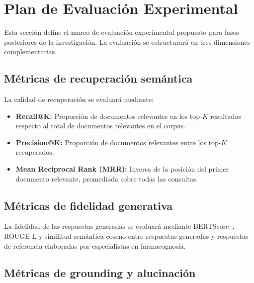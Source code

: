 
\section{Plan de Evaluación Experimental}
\label{sec:experiments}

Esta sección define el marco de evaluación experimental propuesto para fases posteriores de la investigación. La evaluación se estructurará en tres dimensiones complementarias.

\subsection{Métricas de recuperación semántica}
\label{subsec:exp_retrieval_metrics}

La calidad de recuperación se evaluará mediante:

\begin{itemize}[leftmargin=*]
  \item \textbf{Recall@K:} Proporción de documentos relevantes en los top-$K$ resultados respecto al total de documentos relevantes en el corpus.
  \item \textbf{Precision@K:} Proporción de documentos relevantes entre los top-$K$ recuperados.
  \item \textbf{Mean Reciprocal Rank (MRR):} Inversa de la posición del primer documento relevante, promediada sobre todas las consultas.
\end{itemize}

\subsection{Métricas de fidelidad generativa}
\label{subsec:exp_generation_metrics}

La fidelidad de las respuestas generadas se evaluará mediante BERTScore~\cite{zhang2020bertscore}, ROUGE-L y similitud semántica coseno entre respuestas generadas y respuestas de referencia elaboradas por especialistas en farmacognosia.

\subsection{Métricas de grounding y alucinación}
\label{subsec:exp_grounding_metrics}

